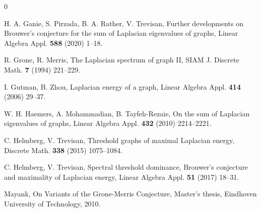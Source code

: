 \documentclass[12pt]{article}
\theoremstyle{plain}
\theoremstyle{definition}
\begin{document}
\begin{thebibliography}{0}
%

H. A. Ganie, S. Pirzada, B. A. Rather, V. Trevisan, Further developments on Brouwer’s conjecture for the sum of Laplacian eigenvalues of graphs, Linear Algebra Appl. {\bf 588} (2020) 1–18.

%


R. Grone, R. Merris, The Laplacian spectrum of graph II, SIAM J. Discrete Math. {\bf 7} (1994) 221–229.


I. Gutman, B. Zhou, Laplacian energy of a graph, Linear Algebra Appl. {\bf 414} (2006) 29–37.

W. H. Haemers, A. Mohammadian, B. Tayfeh-Rezaie, On the sum of Laplacian eigenvalues of graphs, Linear Algebra Appl. {\bf 432} (2010) 2214–2221.

C. Helmberg, V. Trevisan, Threshold graphs of maximal Laplacian energy, Discrete Math. {\bf 338} (2015) 1075–1084.


C. Helmberg, V. Trevisan, Spectral threshold dominance, Brouwer’s conjecture and maximality of Laplacian energy, Linear Algebra Appl. {\bf 51} (2017) 18–31.

Mayank, On Variants of the Grone-Merris Conjecture, Master’s thesis, Eindhoven University of Technology, 2010.


\end{thebibliography}
\end{document}
